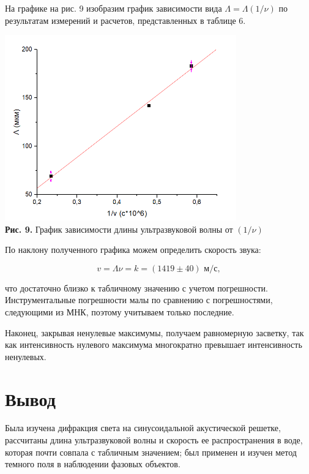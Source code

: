 \documentclass[a4paper,12pt]{article} %
\begin{document}
\hfill \break На графике на рис. 9 изобразим график зависимости вида $\Lambda = \Lambda(1/\nu)$ по результатам измерений и расчетов, представленных в таблице 6.

\begin{center}
\includegraphics[width=0.75\textwidth]{4.3.2_9.png}\\
\textbf{Рис. 9.} График зависимости длины ультразвуковой волны от $(1/\nu)$ \\
\end{center}

\hfill \break По наклону полученного графика можем определить скорость звука:

$$
v = \Lambda \nu = k = (1419 \pm 40) \text{ м/с}, 
$$

\hfill \break что достаточно близко к табличному значению с учетом погрешности. Инструментальные погрешности малы по сравнению с погрешностями, следующими из МНК, поэтому учитываем только последние. 

\hfill \break Наконец, закрывая ненулевые максимумы, получаем равномерную засветку, так как интенсивность нулевого максимума многократно превышает интенсивность ненулевых. 

\section{Вывод}
\hfill \break Была изучена дифракция света на синусоидальной акустической решетке, рассчитаны длина ультразвуковой волны и скорость ее распространения в воде, которая почти совпала с табличным значением; был применен и изучен метод темного поля в наблюдении фазовых объектов.
\end{document}
